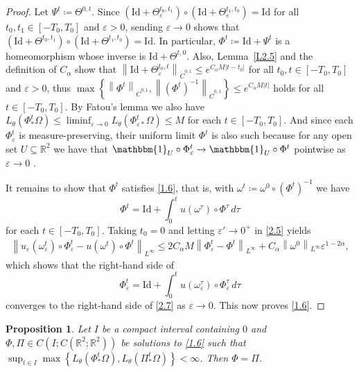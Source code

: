 \documentclass[reqno,centertags,12pt]{amsart}
\newtheorem{proposition}[theorem]{Proposition}
\theoremstyle{definition}
\numberwithin{equation}{section}
\newcommand{\abs}[1]{\left\lvert#1\right\rvert}
\newcommand{\norm}[1]{\left\|#1\right\|}
\newcommand{\set}[1]{\left\{ #1 \right\}}
\newcommand{\bbR}{{\mathbb{R}}}
\newcommand{\eps}{\varepsilon}
\newcommand{\tht}{\theta}
\begin{document}
\begin{proof}
    Let $\Psi^{t}\coloneqq\Theta^{0,t}$.
    Since $(\mathrm{Id} + \Theta_{\eps}^{t_{0},t_{1}})
    \circ(\mathrm{Id}+\Theta_{\eps}^{t_{1},t_{0}}) = \mathrm{Id}$  for
    all $t_{0},t_{1}\in[-T_{0},T_{0}]$ and $\eps>0$, sending $\eps\to 0$ shows that
    $(\mathrm{Id} + \Theta^{t_{0},t_{1}})
    \circ(\mathrm{Id} + \Theta^{t_{1},t_{0}}) = \mathrm{Id}$.  In particular,
    $\Phi^{t}\coloneqq \mathrm{Id} + \Psi^{t}$ is a homeomorphism whose inverse is
    $\mathrm{Id} + \Theta^{t,0}$.
    Also, Lemma~\ref{L2.5} and the definition of $C_{\alpha}$ show that
    $\norm{\mathrm{Id} + \Theta_{\eps}^{t_{0},t}}_{\dot{C}^{0,1}}
    \leq e^{C_{\alpha}M\abs{t - t_{0}}}$ for all $t_{0},t\in[-T_{0},T_{0}]$ and $\eps>0$, thus
    $\max\set{\norm{\Phi^{t}}_{\dot{C}^{0,1}}, \norm{(\Phi^{t})^{-1}}_{\dot{C}^{0,1}}}
    \leq e^{C_{\alpha}M\abs{t}}$ holds for all $t\in[-T_{0},T_{0}]$.
    By Fatou's lemma we also have $L_{\tht}(\Phi_{*}^{t}\Omega)
    \leq \liminf_{\eps\to 0}L_{\tht}(\Phi_{\eps*}^{t}\Omega) \leq M$ for each $t\in[-T_{0},T_{0}]$.
   And since each $\Phi_{\eps}^{t}$ is measure-preserving,
    their uniform limit $\Phi^{t}$ is also such because for any open set $U\subseteq\bbR^{2}$ we have that
    $\mathbbm{1}_{U}\circ\Phi_{\eps}^{t}\to \mathbbm{1}_{U}\circ\Phi^{t}$ pointwise as $\eps\to 0$ .

    It remains to show that $\Phi^{t}$ satisfies \eqref{1.6}, that is,
    with $\omega^{t}\coloneqq\omega^{0}\circ (\Phi^{t})^{-1}$ we have
    \begin{equation}\label{2.7}
        \Phi^{t} = \mathrm{Id} + \int_{0}^{t}
        u(\omega^{\tau})\circ\Phi^{\tau}\,d\tau
    \end{equation}
    for each $t\in[-T_{0},T_{0}]$.
    Taking $t_{0} = 0$ and letting $\eps'\to 0^{+}$ in \eqref{2.5} yields
    \begin{align*}
        \norm{u_{\eps}(\omega_{\eps}^{t})\circ \Phi_{\eps}^{t}
        - u(\omega^{t})\circ \Phi^{t}}_{L^{\infty}}
        \leq 2C_{\alpha}M\norm{\Phi_{\eps}^{t} - \Phi^{t}}_{L^{\infty}}
        + C_{\alpha}\norm{\omega^{0}}_{L^{\infty}}\eps^{1-2\alpha},
    \end{align*}
    which shows that the right-hand side of
    \[
        \Phi_{\eps}^{t} = \mathrm{Id} + \int_{0}^{t}
        u(\omega_{\eps}^{\tau})\circ \Phi_{\eps}^{\tau}\,d\tau
    \]
    converges to the right-hand side of \eqref{2.7}
    as $\eps\to 0$. This now proves \eqref{1.6}.
\end{proof}

\begin{proposition}\label{P2.9}
    Let $I$ be a compact interval containing $0$ and
    $\Phi,\Pi\in C\left(I;C(\bbR^{2};\bbR^{2})\right)$ be solutions to \eqref{1.6} such that
    $\sup_{t\in I}\max\set{L_{\tht}(\Phi_{*}^{t}\Omega),L_{\tht}(\Pi_{*}^{t}\Omega)}<\infty$.
    Then $\Phi = \Pi$.
\end{proposition}
\end{document}
